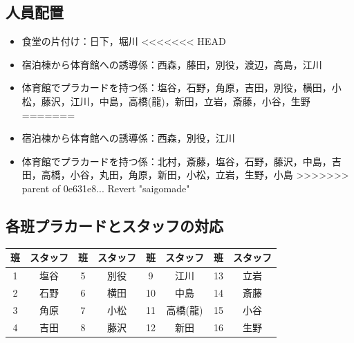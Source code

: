 \vspace{-3mm}
\subsection{人員配置}
\begin{itemize}
\item 食堂の片付け：日下，堀川
<<<<<<< HEAD
\item 宿泊棟から体育館への誘導係：西森，藤田，別役，渡辺，高島，江川
\item 体育館でプラカードを持つ係：塩谷，石野，角原，吉田，別役，横田，小松，藤沢，江川，中島，高橋(龍)，新田，立岩，斎藤，小谷，生野
=======
\item 宿泊棟から体育館への誘導係：西森，別役，江川
\item 体育館でプラカードを持つ係：北村，斎藤，塩谷，石野，藤沢，中島，吉田，高橋，小谷，丸田，角原，新田，小松，立岩，生野，小島
>>>>>>> parent of 0e631e8... Revert "saigomade"
\end{itemize}

\subsection{各班プラカードとスタッフの対応}
\begin{table}[h]
\begin{center}
\label{sec:card}
\begin{tabular}{|c|c||c|c||c|c||c|c|}
\hline
{班}&{スタッフ}&{班}&{スタッフ}&{班}&{スタッフ}&{班}&{スタッフ} \\ \hline\hline
1 & 塩谷 & 5 & 別役 &  9 & 江川 & 13 & 立岩 \\ \hline
2 & 石野 & 6 & 横田 & 10 & 中島 & 14 & 斎藤 \\ \hline
3 & 角原 & 7 & 小松 & 11 & 高橋(龍) & 15 & 小谷 \\ \hline
4 & 吉田 & 8 & 藤沢 & 12 & 新田 &16 & 生野 \\ \hline
\end{tabular}
\end{center}
\end{table}

\vspace{-3mm}
